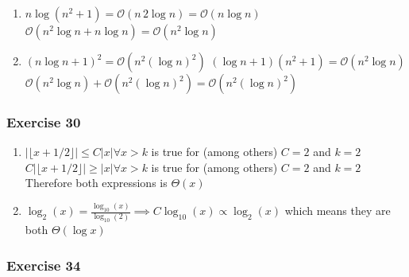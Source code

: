 \documentclass[a4paper]{article}
\newcommand{\ex}[1]{\subsubsection*{#1}}
\begin{document}
\begin{enumerate}[label=\alph*)] %
    \item \(n \log(n^2 + 1) = \mathcal{O}(n\,2\log n) = \mathcal{O}(n\log n)\) \\
        \(\mathcal{O}(n^2 \log n + n \log n) = \mathcal{O}(n^2\log n)\)

    \item \((n\log n + 1)^2 = \mathcal{O}(n^2(\log n)^2) \)
        \((\log n + 1)(n^2 + 1) = \mathcal{O}(n^2 \log n) \)
        \( \mathcal{O}(n^2 \log n) + \mathcal{O}(n^2 (\log n)^2) =
            \mathcal{O}(n^2 (\log n)^2) \)
\end{enumerate}


\ex{Exercise 30} %

\begin{enumerate}[start=3, label=\alph*)] %
    \item \(|\lfloor x + 1/2 \rfloor | \leq C|x| \forall x > k\) is true for
            (among others) \(C = 2\) and \(k = 2\) \\
        \(C|\lfloor x + 1/2 \rfloor | \geq |x| \forall x > k\) is true for
            (among others) \(C = 2\) and \(k = 2\) \\ 
        Therefore both expressions is \(\Theta(x)\)

    \addtocounter{enumi}{1} %
    \item \( \log_2(x) = \frac{\log_{10}(x)}{\log_{10}(2)} \implies 
        C\log_{10}(x) \propto \log_2(x)\) which means they are both
        \(\Theta(\log x)\)
\end{enumerate}


\ex{Exercise 34}
\end{document}
